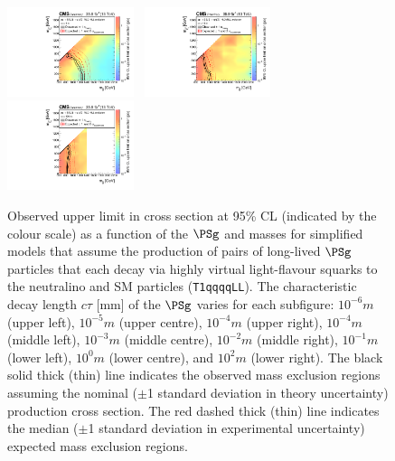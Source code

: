 \begin{figure}[!t]
  \includegraphics[width=0.33\textwidth]{Figures/T1qqqqLL_ctau-1000_XSEC}~
  \includegraphics[width=0.33\textwidth]{Figures/T1qqqqLL_ctau-10000_XSEC}~
  \includegraphics[width=0.33\textwidth]{Figures/T1qqqqLL_ctau-100000_XSEC}\\
  \caption{Observed upper limit in cross section at 95\% CL (indicated
    by the colour scale) as a function of the $\PSg$ and \chiz masses
    for simplified models that assume the production of pairs of
    long-lived $\PSg$ particles that each decay via highly virtual
    light-flavour squarks to the neutralino and SM particles
    (\texttt{T1qqqqLL}). The characteristic decay length $c\tau$ [mm]
    of the $\PSg$ varies for each subfigure: $10^{-6}\unit{m}$ (upper
    left), $10^{-5}\unit{m}$ (upper centre), $10^{-4}\unit{m}$ (upper
    right), $10^{-4}\unit{m}$ (middle left), $10^{-3}\unit{m}$ (middle
    centre), $10^{-2}\unit{m}$ (middle right), $10^{-1}\unit{m}$
    (lower left), $10^{0}\unit{m}$ (lower centre), and
    $10^{2}\unit{m}$ (lower right).  The black solid thick (thin) line
    indicates the observed mass exclusion regions assuming the nominal
    ($\pm$1 standard deviation in theory uncertainty) production cross
    section. The red dashed thick (thin) line indicates the median
    ($\pm$1 standard deviation in experimental uncertainty) expected
    mass exclusion regions.  }
  \label{fig:longlived} 
\end{figure} 


